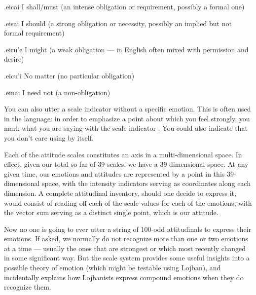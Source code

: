 \begin{example}
.eicai\n
I shall/must\n
(an intense obligation or requirement, possibly\n
\T	a formal one)
\end{example}

\begin{example}
.eisai\n
I should\n
(a strong obligation or necessity, possibly an\n
\T	implied but not formal requirement)
\end{example}

\begin{example}
.eiru'e\n
I might\n
(a weak obligation --- in English often mixed\n
\T	with permission and desire)
\end{example}

\begin{example}
.eicu'i\n
No matter\n
(no particular obligation)
\end{example}

\begin{example}
.einai\n
I need not\n
(a non-obligation)
\end{example}

You can also utter a scale indicator without a specific
    emotion. This is often used in the language: in order to
    emphasize a point about which you feel strongly, you mark what
    you are saying with the scale indicator . You could also
    indicate that you don't care using  by itself.



Each of the attitude scales constitutes an axis in a
    multi-dimensional space. In effect, given our total so far of
    39 scales, we have a 39-dimensional space. At any given time,
    our emotions and attitudes are represented by a point in this
    39-dimensional space, with the intensity indicators serving as
    coordinates along each dimension. A complete attitudinal
    inventory, should one decide to express it, would consist of
    reading off each of the scale values for each of the emotions,
    with the vector sum serving as a distinct single point, which
    is our attitude.

Now no one is going to ever utter a string of 100-odd
    attitudinals to express their emotions. If asked, we normally
    do not recognize more than one or two emotions at a time ---
    usually the ones that are strongest or which most recently
    changed in some significant way. But the scale system provides
    some useful insights into a possible theory of emotion (which
    might be testable using Lojban), and incidentally explains how
    Lojbanists express compound emotions when they do recognize
    them.

